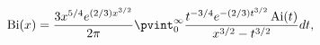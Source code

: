 \[\mathop{\mathrm{Bi}\/}\nolimits\!\left(x\right)=\frac{3x^{5/4}e^{(2/3)x^{3/2}}%
}{2\pi}\*\pvint_{0}^{\infty}\frac{t^{-3/4}e^{-(2/3)t^{3/2}}\mathop{\mathrm{Ai}%
\/}\nolimits\!\left(t\right)}{x^{3/2}-t^{3/2}}dt,\]